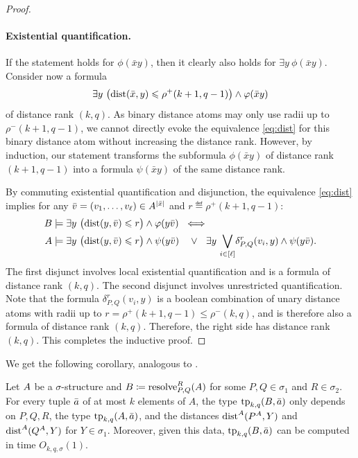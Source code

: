 \begin{proof}
    \paragraph{Existential quantification.}
    If the statement holds for \(\phi(\bar x y)\), then it clearly also holds for \(\exists y~ \phi(\bar x y)\).
    Consider now a formula
   \[\exists y~\bigl(\mathrm{dist}(\bar x,y) \leqslant \rho^+(k+1,q-1)\bigr) \land \varphi(\bar x y)\] of distance rank \((k,q)\).
    As binary distance atoms may only use radii up to \(\rho^-(k+1,q-1)\), we
    cannot directly evoke the equivalence \eqref{eq:dist} for this binary distance
    atom without increasing the distance rank.
    However, by induction, our statement transforms the subformula \(\phi(\bar x y)\) of distance rank \((k+1,q-1)\) into a \distFO formula \(\psi(\bar x y)\) of the same distance rank.

    By commuting existential quantification and disjunction, the equivalence \eqref{eq:dist}  implies for any \(\bar v=(v_1,\ldots,v_\ell)\in A^{|\bar x|}\) and $r\eqdef\rho^+(k+1,q-1)$:
    \begin{align*}
        B &\models \exists y~\bigl(\mathrm{dist}(y,\bar v) \leqslant r \bigr) \land \varphi(y\bar v) ~\iff~ \\
        A &\models \exists y~ \bigl(\mathrm{dist}(y,\bar v) \leqslant r\bigr)  \land \psi(y\bar v)\ \ \  \lor\ \ \exists y~  {\bigvee_{i\in [\ell]}}   \delta^r_{P,Q}(v_i,y)
        \land \psi(y\bar v).
    \end{align*}
    The first disjunct involves
    local existential quantification and is a \distFO formula of distance rank $(k,q)$.
    The second disjunct involves unrestricted quantification. Note that the formula $\delta^r_{P,Q}(v_i,y)$ is a boolean combination of unary distance atoms
    with radii up to \(r=\rho^+(k+1,q-1)\le \rho^-(k,q)\), and is therefore also a \distFO formula of distance rank $(k,q)$.
Therefore, the right side has distance rank \((k,q)\).
    This completes the inductive proof.
\end{proof}

We get the following corollary,
analogous  to .
\begin{corollary}\label{cor:resolve-interp}
     Let ${{A}}$ be a $\sigma$-structure and \({{B}} \coloneqq \mathrm{resolve}^{R}_{P,Q}({{A}})\)
    for some $P,Q\in\sigma_1$ and $R\in\sigma_2$.
    For every tuple $\bar a$ of at most $k$ elements of $A$,
    the type $\textnormal{tp}_{k,q}(B,\bar a)$
    only depends on $P,Q,R$, the type
    $\textnormal{tp}_{k,q}(A,\bar a)$,
    and the distances  $\mathrm{dist}^A(P^A,Y)$ and $\mathrm{dist}^A(Q^A,Y)$ for $Y\in \sigma_1$.
Moreover, given this data,
$\textnormal{tp}_{k,q}(B,\bar a)$ can be computed in time $O_{k,q,\sigma}(1)$.
\end{corollary}



